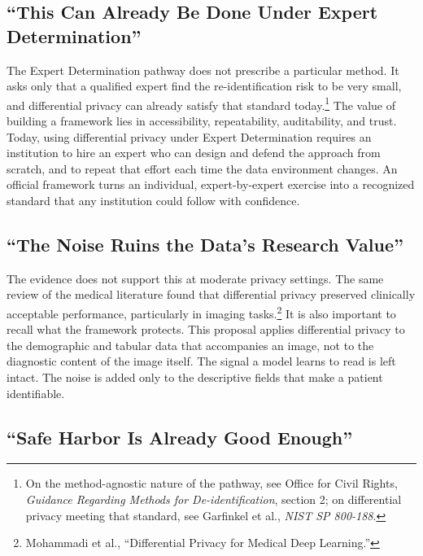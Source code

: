 \documentclass[11pt]{article}
\begin{document}
\subsection{``This Can Already Be Done Under Expert Determination''}

The Expert Determination pathway does not prescribe a particular method. It asks only that a qualified expert find the re-identification risk to be very small, and differential privacy can already satisfy that standard today.\footnote{On the method-agnostic nature of the pathway, see Office for Civil Rights, \textit{Guidance Regarding Methods for De-identification}, section 2; on differential privacy meeting that standard, see Garfinkel et al., \textit{NIST SP 800-188}.} The value of building a framework lies in accessibility, repeatability, auditability, and trust. Today, using differential privacy under Expert Determination requires an institution to hire an expert who can design and defend the approach from scratch, and to repeat that effort each time the data environment changes. An official framework turns an individual, expert-by-expert exercise into a recognized standard that any institution could follow with confidence.

\subsection{``The Noise Ruins the Data's Research Value''}

The evidence does not support this at moderate privacy settings. The same review of the medical literature found that differential privacy preserved clinically acceptable performance, particularly in imaging tasks.\footnote{Mohammadi et al., ``Differential Privacy for Medical Deep Learning.''} It is also important to recall what the framework protects. This proposal applies differential privacy to the demographic and tabular data that accompanies an image, not to the diagnostic content of the image itself. The signal a model learns to read is left intact. The noise is added only to the descriptive fields that make a patient identifiable.

\subsection{``Safe Harbor Is Already Good Enough''}
\end{document}

